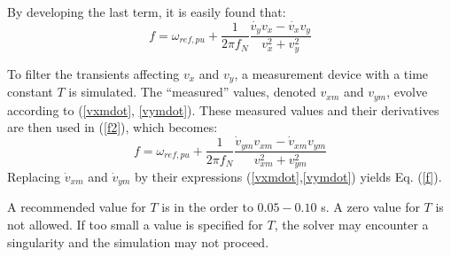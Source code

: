 By developing the last term, it is easily found that:
\begin{equation}\label{f2}
f = \omega_{ref, pu} + \frac{1}{2 \pi f_N} \frac{\dot{v_y} v_x - \dot{v_x} v_y}{v_x^2 + v_y^2}
\end{equation}

To filter the transients affecting $v_x$ and $v_y$, a measurement device with a time constant $T$ is simulated. The ``measured'' values, denoted $v_{xm}$ and $v_{ym}$, evolve according to (\ref{vxmdot}, \ref{vymdot}). These measured values and their derivatives are then used in (\ref{f2}), which becomes:
\[ f = \omega_{ref, pu} + \frac{1}{2 \pi f_N} \frac{\dot{v}_{ym} v_{xm} - \dot{v}_{xm} v_{ym}}{v_{xm}^2 + v_{ym}^2} \]
Replacing $\dot{v}_{xm}$ and $\dot{v}_{ym}$ by their expressions (\ref{vxmdot},\ref{vymdot}) yields Eq. (\ref{f}).

\vspace*{2ex}
A recommended value for $T$ is in the order to $0.05 - 0.10$ s. A zero value for $T$ is not allowed. If too small a value is specified for $T$, the solver may encounter a singularity and the simulation may not proceed.

